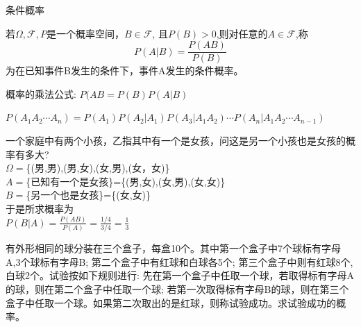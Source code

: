 \documentclass[xcolor=svgnames,serif,table,10pt]{beamer}
\begin{document}
\begin{frame}{条件概率}
\begin{definition}
	若$\Omega,\mathcal{F},P$是一个概率空间，$B\in\mathcal{F}$, 且$P(B)>0$,则对任意的$A\in\mathcal{F}$,称
	$$P(A|B)=\frac{P(AB)}{P(B)}$$
	为在已知事件B发生的条件下，事件A发生的条件概率。
\end{definition}
\begin{corollary}
概率的乘法公式:  $P(AB=P(B)P(A|B)$
\end{corollary}

\begin{corollary}
	$P(A_1A_2\cdots A_n)=P(A_1)P(A_2|A_1)P(A_3|A_1A_2)\cdots P(A_n|A_1A_2\cdots A_{n-1})$
\end{corollary}
\end{frame}

\begin{frame}
\begin{example}
	一个家庭中有两个小孩，乙指其中有一个是女孩，问这是另一个小孩也是女孩的概率有多大?\\
	$\Omega=$\{(男,男),(男,女),(女,男),(女，女)\}\\
	$A=$\{已知有一个是女孩\}=\{(男,女),(女,男),(女,女)\}\\
	$B=$\{另一个也是女孩\}=\{(女,女)\}\\
	于是所求概率为\\
	$P(B|A)=\frac{P(AB)}{P(A)}=\frac{1/4}{3/4}=\frac{1}{3}$
\end{example}
\end{frame}

\begin{frame}
\begin{example}
	有外形相同的球分装在三个盒子，每盒10个。其中第一个盒子中7个球标有字母A,3个球标有字母B; 第二个盒子中有红球和白球各5个; 第三个盒子中则有红球8个,白球2个。试验按如下规则进行: 先在第一个盒子中任取一个球，若取得标有字母A的球，则在第二个盒子中任取一个球; 若第一次取得标有字母B的球，则在第三个盒子中任取一个球。如果第二次取出的是红球，则称试验成功。求试验成功的概率。
\end{example}
\end{frame}
\end{document}
